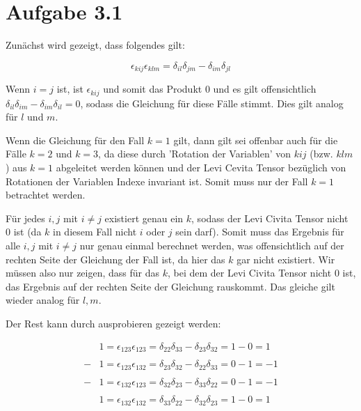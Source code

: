 \documentclass{theozettel}
\begin{document}

\section*{Aufgabe 3.1} 

Zunächst wird gezeigt, dass folgendes gilt:

$$
\epsilon_{kij} \epsilon_{klm} = \delta_{il} \delta_{jm} - \delta_{im} \delta_{jl}
$$

Wenn $i = j$ ist, ist $\epsilon_{kij}$ und somit das Produkt $0$ und es gilt offensichtlich $\delta_{il} \delta_{im} - \delta_{im} \delta_{il} = 0$, sodass die Gleichung für diese Fälle stimmt.
Dies gilt analog für $l$ und $m$.

Wenn die Gleichung für den Fall $k=1$ gilt, dann gilt sei offenbar auch für die Fälle $k=2$ und $k=3$, da diese durch 'Rotation der Variablen' von $kij$ (bzw. $klm$) aus $k=1$ abgeleitet werden können und der Levi Cevita Tensor bezüglich von Rotationen der Variablen Indexe invariant ist. Somit muss nur der Fall $k=1$ betrachtet werden.

Für jedes $i,j$ mit $i \neq j$ existiert genau ein $k$, sodass der Levi Civita Tensor nicht $0$ ist (da $k$ in diesem Fall nicht $i$ oder $j$ sein darf).
Somit muss das Ergebnis für alle $i,j$ mit $i \neq j$ nur genau einmal berechnet werden, was offensichtlich auf der rechten Seite der Gleichung der Fall ist, da hier das $k$ gar nicht existiert. Wir müssen also nur zeigen, dass für das $k$, bei dem der Levi Civita Tensor nicht $0$ ist, das Ergebnis auf der rechten Seite der Gleichung rauskommt. %
Das gleiche gilt wieder analog für $l,m$.

Der Rest kann durch ausprobieren gezeigt werden:

\begin{align*}
	&1 = \epsilon_{123} \epsilon_{123} = \delta_{22} \delta_{33} - \delta_{23} \delta_{32} = 1 - 0 = 1 \\ \\
	-&1 = \epsilon_{123} \epsilon_{132} = \delta_{23} \delta_{32} - \delta_{22} \delta_{33} = 0 - 1 = -1 \\ \\
	-&1 = \epsilon_{132} \epsilon_{123} = \delta_{32} \delta_{23} - \delta_{33} \delta_{22} = 0 - 1 = -1 \\ \\
	&1 = \epsilon_{132} \epsilon_{132} = \delta_{33} \delta_{22} - \delta_{32} \delta_{23} = 1 - 0 = 1
\end{align*}
\end{document}

